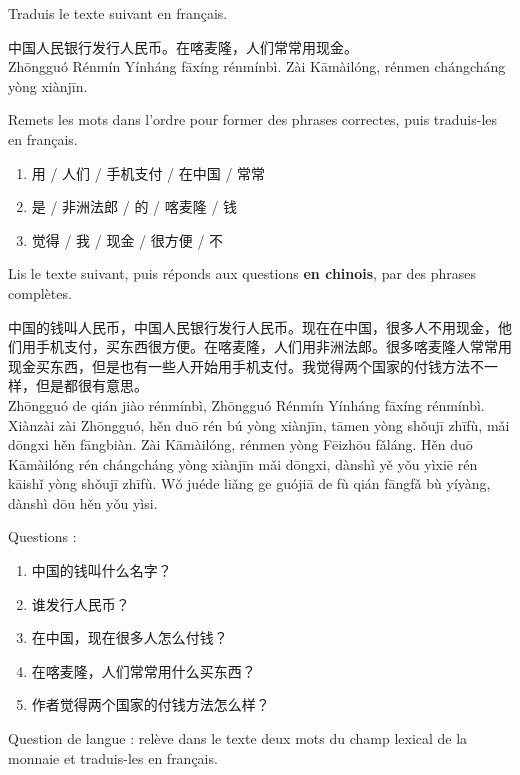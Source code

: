 \documentclass[11pt]{article}
\newcounter{popsec}
\newcounter{popsub}
\newcommand{\courssub}[1]{%
  \stepcounter{popsub}%
  \par\vspace{9pt}\noindent{\popxbold\fontsize{11.5}{13}\selectfont\color{popink}{\color{poporange}\thepopsec.\thepopsub}\hspace{6pt}#1}\par\nopagebreak\vspace{4pt}
}
\begin{document}
\begin{exercice}
Traduis le texte suivant en français.

\begin{textebox}
中国人民银行发行人民币。在喀麦隆，人们常常用现金。\\
Zhōngguó Rénmín Yínháng fāxíng rénmínbì. Zài Kāmàilóng, rénmen chángcháng yòng xiànjīn.
\end{textebox}
\end{exercice}

\begin{exercice}
Remets les mots dans l'ordre pour former des phrases correctes, puis traduis-les en français.
\begin{enumerate}
\item 用 / 人们 / 手机支付 / 在中国 / 常常
\item 是 / 非洲法郎 / 的 / 喀麦隆 / 钱
\item 觉得 / 我 / 现金 / 很方便 / 不
\end{enumerate}
\end{exercice}

\courssub{Je me prépare au Bac}

\begin{exercice}
Lis le texte suivant, puis réponds aux questions \textbf{en chinois}, par des phrases complètes.

\begin{textebox}
中国的钱叫人民币，中国人民银行发行人民币。现在在中国，很多人不用现金，他们用手机支付，买东西很方便。在喀麦隆，人们用非洲法郎。很多喀麦隆人常常用现金买东西，但是也有一些人开始用手机支付。我觉得两个国家的付钱方法不一样，但是都很有意思。\\
Zhōngguó de qián jiào rénmínbì, Zhōngguó Rénmín Yínháng fāxíng rénmínbì. Xiànzài zài Zhōngguó, hěn duō rén bú yòng xiànjīn, tāmen yòng shǒujī zhīfù, mǎi dōngxi hěn fāngbiàn. Zài Kāmàilóng, rénmen yòng Fēizhōu fǎláng. Hěn duō Kāmàilóng rén chángcháng yòng xiànjīn mǎi dōngxi, dànshì yě yǒu yìxiē rén kāishǐ yòng shǒujī zhīfù. Wǒ juéde liǎng ge guójiā de fù qián fāngfǎ bù yíyàng, dànshì dōu hěn yǒu yìsi.
\end{textebox}

Questions :
\begin{enumerate}
\item 中国的钱叫什么名字？
\item 谁发行人民币？
\item 在中国，现在很多人怎么付钱？
\item 在喀麦隆，人们常常用什么买东西？
\item 作者觉得两个国家的付钱方法怎么样？
\end{enumerate}

Question de langue : relève dans le texte deux mots du champ lexical de la monnaie et traduis-les en français.
\end{exercice}
\end{document}
